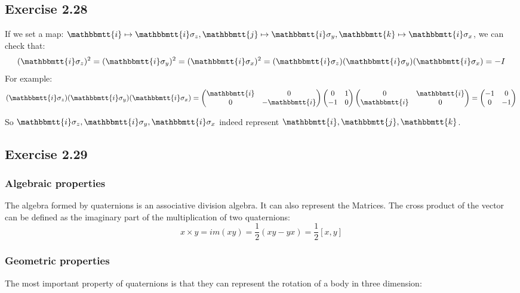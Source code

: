 \documentclass[]{ctexart}
\newcommand{\mi}{\mathbbmtt{i}}
\newcommand{\mj}{\mathbbmtt{j}}
\newcommand{\mk}{\mathbbmtt{k}}
\begin{document}
	\subsection{Exercise 2.28}
		If we set a map: $\mi\mapsto \mi\sigma_z,\mj\mapsto \mi\sigma_y,\mk\mapsto \mi\sigma_x$, we can check that:
		\begin{equation*}
			(\mi\sigma_z)^2=(\mi\sigma_y)^2=(\mi\sigma_x)^2=(\mi\sigma_z)(\mi\sigma_y)(\mi\sigma_x)=-I
		\end{equation*}
		For example: 
		\begin{equation*}
		\begin{aligned}
			(\mi\sigma_z)(\mi\sigma_y)(\mi\sigma_x)=
			\begin{pmatrix}
			\mi & 0\\
			0 & -\mi
			\end{pmatrix}
			\begin{pmatrix}
			0 & 1\\
			-1 & 0
			\end{pmatrix}
			\begin{pmatrix}
			0 & \mi\\
			\mi & 0
			\end{pmatrix}
			=
			\begin{pmatrix}
			-1 & 0\\
			0 & -1
			\end{pmatrix}
		\end{aligned}
		\end{equation*}
		
		So $\mi\sigma_z,\mi\sigma_y,\mi\sigma_x$ indeed represent $\mi,\mj,\mk$.
		
	\subsection{Exercise 2.29}
		\subsubsection{Algebraic properties}
			The algebra formed by quaternions is an associative division algebra. It can also represent the  Matrices. The cross product of the vector can be defined as the imaginary part of the multiplication of two quaternions:
				\begin{equation*}
					x\times y=im(xy)=\frac{1}{2}(xy-yx)=\frac{1}{2}[x,y]
				\end{equation*}
		\subsubsection{Geometric properties}
			The most important property of quaternions is that they can represent the rotation of a body in three dimension: 
			
\end{document}

